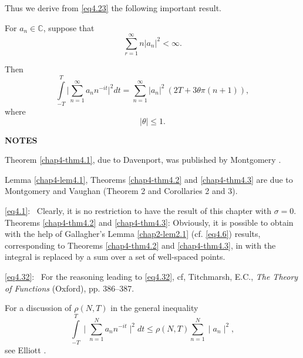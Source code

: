 Thus we derive from \eqref{eq4.23} the following important result. 
 
\begin{theorem}\label{chap4-thm4.3} %
For $a_n \in \mathbb{C}$, suppose that
\begin{equation*}
\sum_{r=1}^\infty n |a_n|^2 < \infty. \tag{4.33}\label{eq4.33}
 \end{equation*}
\end{theorem}
 

 Then
\begin{equation*}
 \int\limits_{-T}^T \bigg|\sum_{n=1}^\infty a_n n^{-it}\bigg|^2
 dt =  \sum_{n=1}^\infty |a_n|^2 ~(2T + 3 \theta \pi (n+1)),
 \tag{4.34}\label{eq4.34}  
 \end{equation*} 
  where
 \begin{equation*}
 |\theta | \leq 1. \tag{4.35}\label{eq4.35}
 \end{equation*} 

\medskip
\begin{center} 
{\bf NOTES}
\end{center}

Theorem \ref{chap4-thm4.1}, due to Davenport, was published by
Montgomery \cite{key2}. 

Lemma \ref{chap4-lem4.1}, Theorems \ref{chap4-thm4.2} and
\ref{chap4-thm4.3} are due to Montgomery and Vaughan \cite{key1}
(Theorem 2 and Corollaries 2 and 3). 

\eqref{eq4.1}:~ Clearly, it is no restriction to have the result of
this chapter with $\sigma = 0$. Theorems \ref{chap4-thm4.2} and
\ref{chap4-thm4.3}: Obviously, it is possible to obtain with the help
of Gallagher's Lemma \ref{chap2-lem2.1} (cf. \eqref{eq4.6}) results,
corresponding to Theorems \ref{chap4-thm4.2} and \ref{chap4-thm4.3},
in with the integral is replaced by a sum over a set of well-spaced
points. 

\eqref{eq4.32}:~ For the reasoning leading to \eqref{eq4.32}, cf,
Titchmarsh, E.C., \textit{The Theory of Functions} (Oxford),
pp. 386--387. 


For a discussion of $\rho (N,T)$ in the general inequality 
\begin{equation*}
\int\limits^T_{-T} \mid \sum^N_{n=1} a_n n^{-it} \mid^2 dt \leq \rho
(N,T)
\sum^N_{n=1} \mid a_n \mid^2, \tag{4.36}\label{eq4.36} 
\end{equation*}
see Elliott \cite{key7}.
